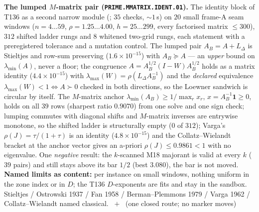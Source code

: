 \documentclass[11pt,a4paper]{article}
\theoremstyle{definition}
\begin{document}
\par\smallskip\noindent\textbf{The lumped $M$-matrix pair
(\texttt{PRIME.MMATRIX.IDENT.01}).}
The identity block of T136 as a second narrow module
(; $35$ checks, ${\sim}1$\,s) on $20$
small frame-A seam windows ($n=4\ldots59$, $\rho=1.25\ldots4.00$,
$h=25\ldots299$, every factorised matrix $\le300$), $312$ shifted ladder rungs
and $8$ whitened two-grid rungs, each statement with a preregistered tolerance
and a mutation control. The lumped pair $A_B=A+L_\Delta$ is Stieltjes and
row-sum preserving ($1.6\times10^{-15}$) with $A_B\succeq A$ --- an \emph{upper}
bound on $\lambda_{\min}(A)$, never a floor; the congruence
$A=A_B^{1/2}(I-W)A_B^{1/2}$ holds as a matrix identity ($4.4\times10^{-15}$) with
$\lambda_{\max}(W)=\rho(L_\Delta A_B^{-1})$ and the \emph{declared} equivalence
$\lambda_{\max}(W)<1\iff A\succ0$ checked in both directions, so the Loewner
sandwich is circular by itself. The $M$-matrix anchor
$\lambda_{\min}(A_B)\ge1/\max_r x_r$, $x=A_B^{-1}\mathbf 1\ge0$, holds on all
$39$ rows (sharpest ratio $0.9070$) from one solve and one sign check; lumping
commutes with diagonal shifts and $M$-matrix inverses are entrywise monotone, so
the shifted ladder is structurally empty ($0$ of $312$); Varga's
$\rho(J)=\tau/(1+\tau)$ is an identity ($4.8\times10^{-15}$) and the
Collatz--Wielandt bracket at the anchor vector gives an a-priori
$\rho(J)\le0.9861<1$ with no eigenvalue. One \emph{negative} result: the
$k$-scanned M18 majorant is valid at every $k$ ($39$ pairs) and still stays above
its bar $1/2$ (best $3.080$), the bar is not moved.
\textbf{Named limits as content:} per instance on small windows, nothing uniform
in the zone index or in $D$; the T136 $D$-exponents are fits and stay in the
sandbox. Stieltjes / Ostrowski 1937 / Fan 1958 / Berman--Plemmons 1979 /
Varga 1962 / Collatz--Wielandt named classical.
\mE\ $+$ \mX\ (one closed route; no marker moves)
\par\smallskip
\end{document}
